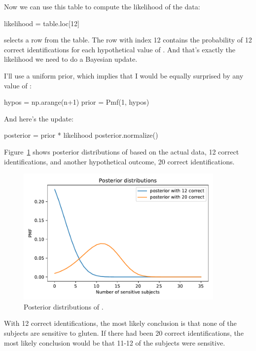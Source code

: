 \documentclass[12pt]{book}
\theoremstyle{exercise}
\begin{document}
Now we can use this table to compute the likelihood of the data:

\begin{code}
likelihood = table.loc[12]
\end{code}

 selects a row from the table.
The row with index 12 contains the probability of 12 correct identifications for each hypothetical value of .
And that's exactly the likelihood we need to do a Bayesian update.

I'll use a uniform prior, which implies that I would be equally surprised by any value of :

\begin{code}
hypos = np.arange(n+1)
prior = Pmf(1, hypos)
\end{code}

And here's the update:

\begin{code}
posterior = prior * likelihood
posterior.normalize()
\end{code}

Figure~\ref{fig05-04} shows posterior distributions of  based on the actual data, 12 correct identifications, and another hypothetical outcome, 20 correct identifications.

\begin{figure}
\centerline{\includegraphics[width=4in]{figs/fig05-04.pdf}}
\caption{Posterior distributions of .}
\label{fig05-04}
\end{figure}

With 12 correct identifications, the most likely conclusion is that none of the subjects are sensitive to gluten.
If there had been 20 correct identifications, the most likely conclusion would be that 11-12 of the subjects were sensitive.
\end{document}

